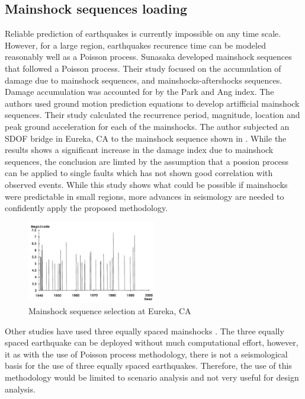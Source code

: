 \subsection{Mainshock sequences loading}

Reliable prediction of earthquakes is currently impossible on any time scale.  However, for a large region, earthquakes recurence time can be modeled reasonably well as a Poisson process. Sunasaka \cite{Sunasaka1993} developed mainshock sequences that followed a Poisson process. Their study focused on the accumulation of damage due to mainshock sequences, and mainshocks-aftershocks sequences. Damage accumulation was accounted for by the Park and Ang index. The authors used ground motion prediction equations to develop artifficial mainshock sequences. Their study calculated the recurrence period, magnitude, location and peak ground acceleration for each of the mainshocks. The author subjected an SDOF bridge in Eureka, CA to the mainshock sequence shown in   . While the results shows a significant increase in the damage index due to mainshock sequences, the conclusion are limted by the assumption that a possion process can be applied to single faults which has not shown good correlation with observed events\cite{Shearer2009}. While this study shows what could be possible if mainshocks were predictable in small regions, more advances in seismology are needed to confidently apply the proposed methodology.

\begin{figure}[htbp]
\centering
\includegraphics[width=0.5\textwidth]{Chapter-2/figs/Mainshock_sequence_01}
\caption{Mainshock sequence selection at Eureka, CA \cite{Sunasaka1993}}
\label{fig:MS-MS_Sunasaka}
\end{figure}

Other studies have used three equally spaced mainshocks \cite{Hatzigeorgiou2009}. The three equally spaced earthquake can be deployed without much computational effort, however, it as with the use of Poisson process methodology, there is not a seismological basis for the use of three equally spaced earthquakes. Therefore, the use of this methodology would be limited to scenario analysis and not very useful for design analysis.

